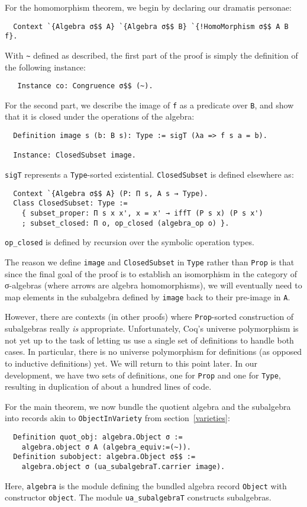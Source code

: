 \documentclass[a4paper,10pt,runningheads]{llncs}
\begin{document}
For the homomorphism theorem, we begin by declaring our dramatis personae:
\begin{lstlisting}
  Context `{Algebra σ$$ A} `{Algebra σ$$ B} `{!HomoMorphism σ$$ A B f}.
\end{lstlisting}
With \lstinline|~| defined as described, the first part of the proof is simply the definition of the following instance:
\begin{lstlisting}
   Instance co: Congruence σ$$ (~).
\end{lstlisting}

For the second part, we describe the image of \lstinline|f| as a predicate over \lstinline|B|, and show that it is closed under the operations of the algebra: 
\begin{lstlisting}
  Definition image s (b: B s): Type := sigT (λa => f s a = b).

  Instance: ClosedSubset image.
\end{lstlisting}
\lstinline|sigT| represents a \lstinline|Type|-sorted existential. \lstinline|ClosedSubset| is defined elsewhere as:
\begin{lstlisting}
  Context `{Algebra σ$$ A} (P: Π s, A s → Type).
  Class ClosedSubset: Type :=
    { subset_proper: Π s x x', x = x' → iffT (P s x) (P s x')
    ; subset_closed: Π o, op_closed (algebra_op o) }.
\end{lstlisting}
\lstinline|op_closed| is defined by recursion over the symbolic operation types.

The reason we define \lstinline|image| and \lstinline|ClosedSubset| in \lstinline|Type| rather than \lstinline|Prop| is that since the final goal of the proof is to establish an isomorphism in the category of σ-algebras (where arrows are algebra homomorphisms), we will eventually need to map elements in the subalgebra defined by \lstinline|image| back to their pre-image in \lstinline|A|.

However, there are contexts (in other proofs) where \lstinline|Prop|-sorted construction of subalgebras really \emph{is} appropriate. Unfortunately, Coq's universe polymorphism is not yet up to the task of letting us use a single set of definitions to handle both cases. In particular, there is no universe polymorphism for definitions (as opposed to inductive definitions) yet. We will return to this point later. In our development, we have two sets of definitions, one for \lstinline|Prop| and one for \lstinline|Type|, resulting in duplication of about a hundred lines of code.

For the main theorem, we now bundle the quotient algebra and the subalgebra into records akin to \lstinline|ObjectInVariety| from section~\ref{varieties}:
\begin{lstlisting}
  Definition quot_obj: algebra.Object σ :=
    algebra.object σ A (algebra_equiv:=(~)).
  Definition subobject: algebra.Object σ$$ :=
    algebra.object σ (ua_subalgebraT.carrier image).
\end{lstlisting}
Here, \lstinline|algebra| is the module defining the bundled algebra record \lstinline|Object| with constructor \lstinline|object|. The module \lstinline|ua_subalgebraT| constructs subalgebras.
\end{document}
